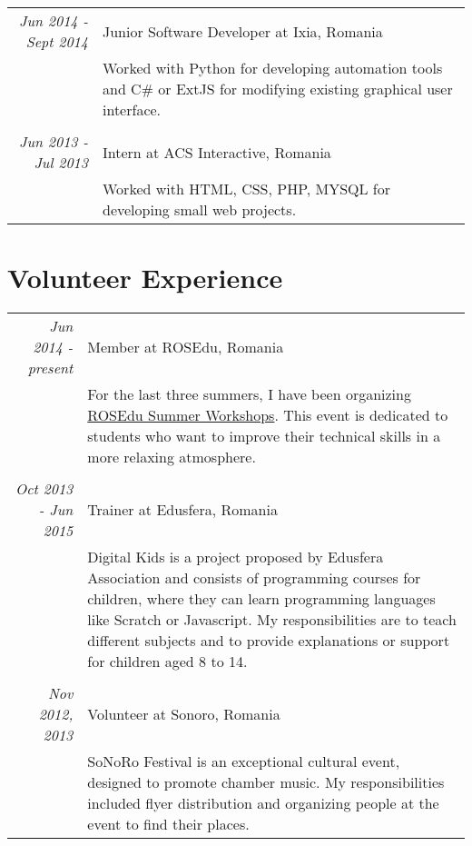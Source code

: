 \documentclass[a4paper,10pt]{article} %
\begin{document}
\begin{tabular}{r|p{11cm}}
\emph{Jun 2014 - Sept 2014} & Junior Software Developer at Ixia, Romania\\
& \footnotesize{Worked with Python for developing automation tools and C\# or ExtJS for modifying existing graphical user interface.}\\
\multicolumn{2}{c}{} \\


\emph{Jun 2013 - Jul 2013} & Intern at ACS Interactive, Romania\\
& \footnotesize{Worked with HTML, CSS, PHP, MYSQL for developing small web projects.}
\end{tabular}



\section{Volunteer Experience}
\begin{tabular}{r|p{11cm}}

\emph{Jun 2014 - present} & Member at ROSEdu, Romania\\
& \footnotesize{For the last three summers, I have been organizing \href{http://workshop.rosedu.org/}{ROSEdu Summer Workshops}. This event is dedicated to students who want to improve their technical skills in a more relaxing atmosphere.}\\
\multicolumn{2}{c}{} \\


\emph{Oct 2013 - Jun 2015} & Trainer at Edusfera, Romania \\
& \footnotesize{Digital Kids is a project proposed by Edusfera Association and consists of programming courses for children, where they can learn programming languages like Scratch or Javascript. My responsibilities are to teach different subjects and to provide explanations or support for children aged 8 to 14.}\\
\multicolumn{2}{c}{} \\


\emph{Nov 2012, 2013} & Volunteer at Sonoro, Romania\\
& \footnotesize{SoNoRo Festival is an exceptional cultural event, designed to promote chamber music. My responsibilities included flyer distribution and organizing people at the event to find their places.}
\end{tabular}
\end{document}
